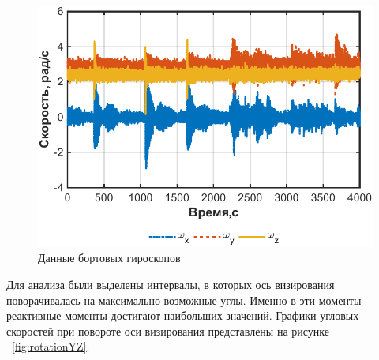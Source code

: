 \begin{figure}[h]
	\centering
	\includegraphics[width=0.8\linewidth]{matlab/img/sat_gyro_data.pdf}
	\caption{Данные бортовых гироскопов}
	\label{fig:sat_gyro_data}
	\end{figure}

Для анализа были выделены интервалы, в которых ось визирования поворачивалась на максимально возможные углы. Именно в эти моменты реактивные моменты достигают наибольших значений. Графики угловых скоростей при повороте оси визирования представлены на рисунке ~\cref{fig:rotationYZ}.


